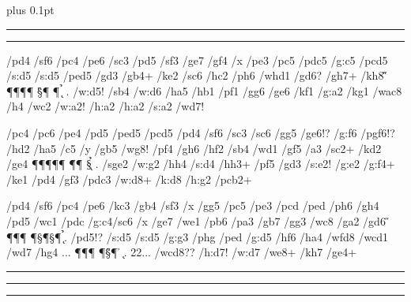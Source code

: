 \nopagenumbers


\vsize=198mm
\hsize=140mm
\columnsep=18pt      %
\columnseprule=0.4pt %
\multicolbaselineskip=0pt plus 0.1pt %

\smallskip

\hrule{}\smallskip\hrule
{}
\menpic

/pd4 /sf6
/pc4 /pe6
/sc3 /pd5
/sf3 /ge7
/gf4 /x
/pe3 /pc5
/pdc5 /g:c5
/pcd5 /s:d5
/s:d5 /ped5
/gd3 /gb4+
/ke2 /sc6
/hc2 /ph6
/whd1 /gd6?
/gh7+ /kh8
\cdiagram
\W\e\G\H\e\W\e\K
\P\P\e\e\e\P\P\g
\e\e\S\G\e\e\e\P
\e\e\e\P\e\e\e\e
\e\e\e\e\e\g\e\e
\e\e\e\e\p\s\e\e
\p\p\h\e\k\p\p\p
\w\e\e\w\e\e\e\e.
/w:d5! /sb4
/w:d6 /ha5
/hb1 /pf1
/gg6 /ge6
/kf1 /g:a2
/kg1 /wac8
/h4 /wc2
/w:a2! /h:a2
/h:a2 /s:a2
/wd7!

\menalph

/pc4 /pc6
/pe4 /pd5
/ped5 /pcd5
/pd4 /sf6
/sc3 /sc6
/gg5 /ge6!?
/g:f6 /pgf6!?
/hd2 /ha5
/c5 /y
/gb5 /wg8!
/pf4 /gh6
/hf2 /sb4
/wd1 /gf5
/a3 /sc2+
/kd2 /ge4
\cdiagram
\e\e\K\W\e\e\W\e
\P\P\e\e\P\P\e\P
\e\e\e\e\e\P\e\G
\H\g\p\P\e\G\e\e
\e\e\e\p\e\p\e\e
\p\e\s\e\e\e\e\e
\e\p\S\k\e\h\p\p
\e\e\e\w\e\e\s\w.
/sge2 /w:g2
/hh4 /s:d4
/hh3+ /pf5
/gd3 /s:e2!
/g:e2 /g:f4+
/ke1 /pd4
/gf3 /pdc3
/w:d8+ /k:d8
/h:g2 /pcb2+

/pd4 /sf6
/pc4 /pe6
/kc3 /gb4
/sf3 /x
/gg5 /pc5
/pe3 /pcd
/ped /ph6
/gh4 /pd5
/wc1 /pdc
/g:c4/sc6
/x   /ge7 %
/we1 /pb6
/pa3 /gb7
/gg3 /wc8
/ga2 /gd6
\cdiagram
\e\e\W\H\e\W\K\e
\P\G\e\e\e\P\P\e
\e\P\S\G\P\S\e\P
\e\e\e\e\e\e\e\e
\e\e\e\p\e\e\e\e
\p\e\s\e\e\s\g\e
\g\p\e\e\e\p\p\p
\e\e\w\h\w\e\k\e.
/pd5!? /s:d5
/s:d5 /g:g3
/phg  /ped
/g:d5 /hf6
/ha4  /wfd8
/wcd1 /wd7
/hg4 ...
\cdiagram
\e\e\W\e\e\e\K\e
\P\G\e\W\e\P\P\e
\e\P\S\e\e\H\e\P
\e\e\e\g\e\e\e\e
\e\e\e\e\e\e\h\e
\p\e\e\e\e\s\p\e
\e\p\e\e\e\p\p\e
\e\e\e\w\w\e\k\e.
22... /wcd8??
/h:d7! /w:d7
/we8+ /kh7
/ge4+

\endmulticols
\hrule{}\smallskip\hrule
\medskip


\medskip\hrule\smallskip


\bye
